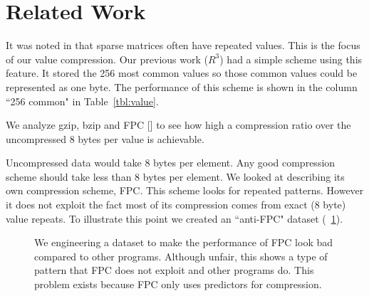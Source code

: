 \section{Related Work}
\label{sec:fziprelated}
It was noted in \cite{prelim:kourtis, prelim:grigoras} that sparse matrices often have repeated values. This is the focus of our value compression. Our previous work ($R^3$) had a simple scheme using this feature. It stored the 256 most common values so those common values could be represented as one byte. The performance of this scheme is shown in the column ``256 common" in Table~\ref{tbl:value}.\par
We analyze gzip, bzip and FPC [\cite{prelim:burtscher}] to see how high a compression ratio over the uncompressed 8 bytes per value is achievable.\par
Uncompressed data would take 8 bytes per element. Any good compression scheme should take less than 8 bytes per element. We looked at \cite{prelim:burtscher} describing its own compression scheme, FPC. This scheme looks for repeated patterns. However it does not exploit the fact most of its compression comes from exact (8 byte) value repeats. To illustrate this point we created an ``anti-FPC" dataset (\figurename~\ref{fig:antiFpc}).
\begin{figure}
    \center
{}
\caption[The Anti-FPC dataset]{We engineering a dataset to make the performance of FPC look bad compared to other programs. Although unfair, this shows a type of pattern that FPC does not exploit and other programs do. This problem exists because FPC only uses predictors for compression.}
\label{fig:antiFpc}
\end{figure}

